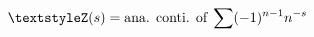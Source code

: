 \documentclass{article}
\begin{document}
\[
\color[rgb]{0.000,0.000,0.000} {
\textstyleZ(s) = \hbox{ana. conti. of}\; \sum (-1)^{n-1}n^{-s}}
\]
\end{document}
